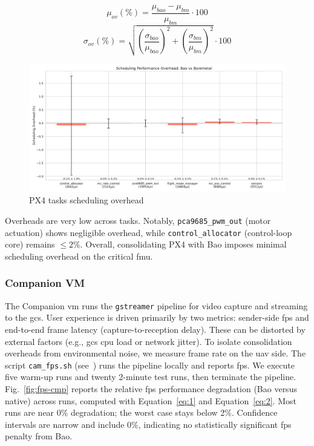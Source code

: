 \begin{equation}
  \label{eq:1}
  \mu_{ov} (\%) = \frac{\mu_{bao} - \mu_{bm}}{\mu_{bm}} \cdot 100
\end{equation}
\begin{equation}
  \label{eq:2}
  \sigma_{ov} (\%) = \sqrt{ \left(\frac{\sigma_{bao}}{\mu_{bao}}\right)^{2} +
    \left(\frac{\sigma_{bm}}{\mu_{bm}}\right)^{2} } \cdot 100
\end{equation}

\begin{figure}[!hbt]
  \centering
  \includegraphics[width=1.0\textwidth]{./img/pdf/px4-sched-overhead} 
  \caption{PX4 tasks scheduling overhead}%
  \label{fig:px4-sched-overhead}
\end{figure}

Overheads are very low across tasks. Notably, \lstinline{pca9685_pwm_out} (motor
actuation) shows negligible overhead, while \lstinline{control_allocator}
(control-loop core) remains $\leq 2\%$. Overall, consolidating PX4 with Bao
imposes minimal scheduling overhead on the critical \gls{fmu}.

\subsubsection{Companion VM}
\label{sec:companion-vm}
The Companion \gls{vm} runs the \lstinline{gstreamer} pipeline for video capture
and streaming to the \gls{gcs}. User experience is driven primarily by two
metrics: sender-side \gls{fps} and end-to-end frame latency
(capture-to-reception delay). These can be distorted by external factors (e.g.,
\gls{gcs} \gls{cpu} load or network jitter).
%
To isolate consolidation overheads from environmental noise, we measure frame
rate on the \gls{uav} side. The script \lstinline{cam_fps.sh}
(see~\cite{thesis-sw-github}) runs the pipeline locally and reports
\gls{fps}. We execute five warm-up runs and twenty 2-minute test runs, then
terminate the pipeline.
%
Fig.~\ref{fig:fps-cmp} reports the relative \gls{fps} performance degradation
(Bao versus native) across runs, computed with Equation~\ref{eq:1} and
Equation~\ref{eq:2}. Most runs are near 0\% degradation; the worst case stays
below 2\%. Confidence intervals are narrow and include 0\%, indicating no
statistically significant \gls{fps} penalty from Bao.

